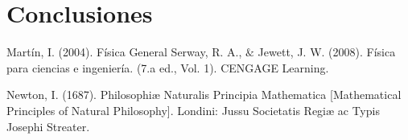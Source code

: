 \documentclass{article}
\begin{document}
\section{Conclusiones}\label{Conclusiones}				%

\begin{thebibliography}{9}						%
		Martín, I. (2004). Física General
		Serway, R. A., $\&$ Jewett, J. W. (2008). Física para ciencias e ingeniería. (7.a
ed., Vol. 1). CENGAGE Learning.

	Newton, I. (1687). Philosophiæ Naturalis Principia Mathematica [Mathematical Principles of Natural Philosophy]. Londini: Jussu Societatis Regiæ ac Typis Josephi Streater.
\end{thebibliography}
\end{document}
